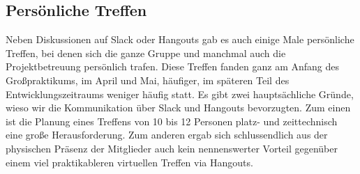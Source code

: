 

\subsection{Persönliche Treffen}
\label{team:group-pers}

Neben Diskussionen auf Slack oder Hangouts gab es auch einige Male persönliche
Treffen, bei denen sich die ganze Gruppe und manchmal auch die
Projektbetreuung persönlich trafen. Diese Treffen fanden ganz am Anfang des
Großpraktikums, im April und Mai, häufiger, im späteren Teil des
Entwicklungszeitraums weniger häufig statt. Es gibt zwei hauptsächliche Gründe,
wieso wir die Kommunikation über Slack und Hangouts bevorzugten. Zum einen ist
die Planung eines Treffens von 10 bis 12 Personen platz- und zeittechnisch eine
große Herausforderung. Zum anderen ergab sich schlussendlich aus der physischen
Präsenz der Mitglieder auch kein nennenswerter Vorteil gegenüber einem viel
praktikableren virtuellen Treffen via Hangouts.
